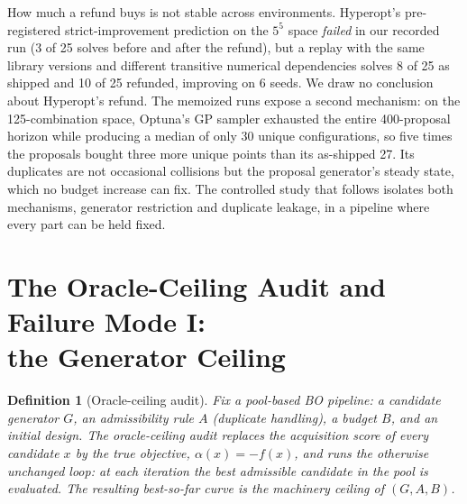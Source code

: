 \documentclass[%
 aip,
 amsmath,amssymb,
 floatfix,
 reprint,%
]{revtex4-1}
\newtheorem{definition}{Definition}
\begin{document}
How much a refund buys is not stable across environments.
Hyperopt's pre-registered strict-improvement prediction on the $5^5$
space \emph{failed} in our recorded run (3 of 25 solves before and after
the refund), but a replay with the same library versions and different
transitive numerical dependencies solves 8 of 25 as shipped and 10 of 25
refunded, improving on 6 seeds. We draw no conclusion about Hyperopt's
refund. The memoized runs expose a second mechanism: on the
125-combination space, Optuna's GP sampler exhausted the entire
400-proposal horizon while producing a median of only 30 unique
configurations, so five times the proposals bought three more unique
points than its as-shipped 27. Its duplicates are not occasional
collisions but the proposal generator's steady state, which no budget
increase can fix. The controlled study that follows isolates both
mechanisms, generator restriction and duplicate leakage, in a pipeline
where every part can be held fixed.

\section{The Oracle-Ceiling Audit and Failure Mode I:\\ the Generator Ceiling}
\label{sec:oracle}

\begin{definition}[Oracle-ceiling audit]
\label{def:oracle}
Fix a pool-based BO pipeline: a candidate generator $G$, an admissibility
rule $A$ (duplicate handling), a budget $B$, and an initial design. The
\emph{oracle-ceiling audit} replaces the acquisition score of every
candidate $x$ by the true objective, $\alpha(x) = -f(x)$, and runs the
otherwise unchanged loop: at each iteration the best admissible candidate
in the pool is evaluated. The resulting best-so-far curve is the
\emph{machinery ceiling} of $(G, A, B)$.
\end{definition}
\end{document}
